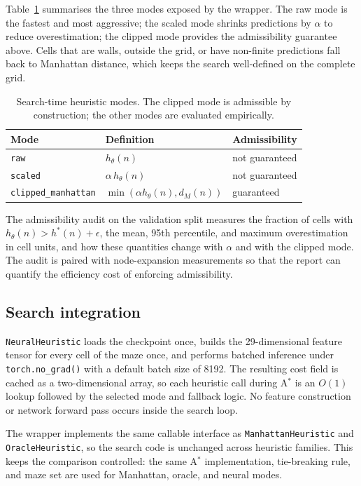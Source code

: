 Table~\ref{tab:heuristic_modes} summarises the three modes exposed by the
wrapper. The raw mode is the fastest and most aggressive; the scaled mode
shrinks predictions by $\alpha$ to reduce overestimation; the clipped mode
provides the admissibility guarantee above. Cells that are walls, outside the
grid, or have non-finite predictions fall back to Manhattan distance, which
keeps the search well-defined on the complete grid.

\begin{table}[H]
  \centering
  \caption{Search-time heuristic modes. The clipped mode is admissible by
  construction; the other modes are evaluated empirically.}
  \label{tab:heuristic_modes}
  \begin{tabular}{lll}
    \toprule
    Mode & Definition & Admissibility \\
    \midrule
    \texttt{raw}               & $h_\theta(n)$                          & not guaranteed \\
    \texttt{scaled}            & $\alpha\,h_\theta(n)$                  & not guaranteed \\
    \texttt{clipped\_manhattan}& $\min(\alpha h_\theta(n), d_M(n))$     & guaranteed \\
    \bottomrule
  \end{tabular}
\end{table}

The admissibility audit on the validation split measures the fraction of cells
with $h_\theta(n)>h^\ast(n)+\epsilon$, the mean, 95th percentile, and maximum
overestimation in cell units, and how these quantities change with $\alpha$ and
with the clipped mode. The audit is paired with node-expansion measurements so
that the report can quantify the efficiency cost of enforcing admissibility.

\subsection{Search integration}
\texttt{NeuralHeuristic} loads the checkpoint once, builds the 29-dimensional
feature tensor for every cell of the maze once, and performs batched inference
under \texttt{torch.no\_grad()} with a default batch size of 8192. The
resulting cost field is cached as a two-dimensional array, so each heuristic
call during A$^\ast$ is an $O(1)$ lookup followed by the selected mode and
fallback logic. No feature construction or network forward pass occurs inside
the search loop.

The wrapper implements the same callable interface as
\texttt{ManhattanHeuristic} and \texttt{OracleHeuristic}, so the search code is
unchanged across heuristic families. This keeps the comparison controlled: the
same A$^\ast$ implementation, tie-breaking rule, and maze set are used for
Manhattan, oracle, and neural modes.

